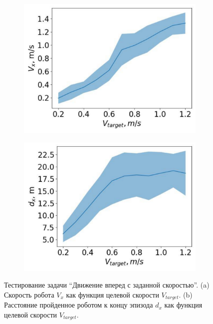 \begin{figure}[ht]
\begin{subfigure}{.5\textwidth}
  \centering
  \includegraphics[width=1\textwidth]{images/vx}
\end{subfigure}%
\begin{subfigure}{.5\textwidth}
  \centering
  \includegraphics[width=1\textwidth]{images/dx}
\end{subfigure}%
\caption{Тестирование задачи ``Движение вперед с заданной скоростью''. (a) Скорость робота $V_x$ как функция целевой скорости $V_{target}$. (b) Расстояние пройденное роботом к концу эпизода $d_x$ как функция целевой скорости $V_{target}$.}
\label{fig:unitree_eval_forward}
\end{figure}

